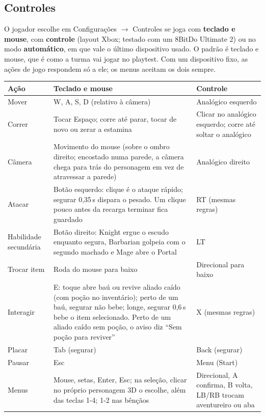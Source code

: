 \documentclass[11pt,a4paper]{article}
\begin{document}
\subsection{Controles}

O jogador escolhe em Configurações $\rightarrow$ Controles se joga com \textbf{teclado e mouse}, com \textbf{controle} (layout Xbox; testado com um 8BitDo Ultimate 2) ou no modo \textbf{automático}, em que vale o último dispositivo usado. O padrão é teclado e mouse, que é como a turma vai jogar no playtest. Com um dispositivo fixo, as ações de jogo respondem só a ele; os menus aceitam os dois sempre.

\begin{xltabular}{\textwidth}{@{}lXX@{}}
\toprule
\textbf{Ação} & \textbf{Teclado e mouse} & \textbf{Controle} \\
\midrule
Mover      & W, A, S, D (relativo à câmera) & Analógico esquerdo \\
Correr     & Tocar Espaço; corre até parar, tocar de novo ou zerar a estamina & Clicar no analógico esquerdo; corre até soltar o analógico \\
Câmera     & Movimento do mouse (sobre o ombro direito; encostado numa parede, a câmera chega para trás do personagem em vez de atravessar a parede) & Analógico direito \\
Atacar     & Botão esquerdo: clique é o ataque rápido; segurar 0,35\,s dispara o pesado. Um clique pouco antes da recarga terminar fica guardado & RT (mesmas regras) \\
Habilidade secundária & Botão direito: Knight ergue o escudo enquanto segura, Barbarian golpeia com o segundo machado e Mage abre o Portal & LT \\
Trocar item & Roda do mouse para baixo & Direcional para baixo \\
Interagir  & E: toque abre baú ou revive aliado caído (com poção no inventário); perto de um baú, segurar não bebe; longe, segurar 0,6\,s bebe o item selecionado. Perto de um aliado caído sem poção, o aviso diz ``Sem poção para reviver'' & X (mesmas regras) \\
Placar     & Tab (segurar) & Back (segurar) \\
Pausar     & Esc & Menu (Start) \\
Menus      & Mouse, setas, Enter, Esc; na seleção, clicar no próprio personagem 3D o escolhe, além das teclas 1-4; 1-2 nas bênçãos & Direcional, A confirma, B volta, LB/RB trocam aventureiro ou aba \\
\bottomrule
\end{xltabular}
\end{document}

